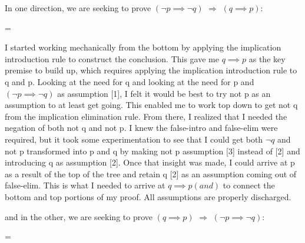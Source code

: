 \documentclass[a4paper,10pt,fleqn]{article}
\begin{document}
\bigskip


\bigskip

\setlength{\leftskip}{\dimexpr\parindent+2em\relax}
\noindent In one direction, we are seeking to prove $(\lnot p \implies \lnot q)$ $\Rightarrow$ $(q \implies p)$:

\bigskip

\savedleftskip=\leftskip
\noindent
{}
\bigskip

\noindent I started working mechanically from the bottom by applying the implication introduction rule to construct the conclusion.  This gave me $q \implies p$ as the key premise to build up, which requires applying the implication introduction rule to q and p. Looking at the need for q and looking at the need for p and $(\lnot p \implies \lnot q)$ as assumption [1], I felt it would be best to try not p as an assumption to at least get going.  This enabled me to work top down to get not q from the implication elimination rule. From there, I realized that I needed the negation of both not q and not p. I knew the false-intro and false-elim were required, but it took some experimentation to see that I could get both $\lnot q$ and not p transformed into p and q by making not p assumption [3] instead of [2] and introducing q as assumption [2]. Once that insight was made, I could arrive at p as a result of the top of the tree and retain q [2] as an assumption coming out of false-elim. This is what I needed to arrive at $q \implies p(and)$ to connect the bottom and top portions of my proof.  All assumptions are properly discharged.

\bigskip

\noindent and in the other, we are seeking to prove $(q \implies p)$ $\Rightarrow$ $(\lnot p \implies \lnot q)$:

\bigskip

\savedleftskip=\leftskip
\noindent
{}
\bigskip
\end{document}
